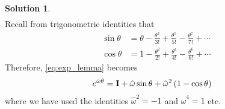 \documentclass[]{article}
\theoremstyle{definition}
\newtheorem{solution}{Solution}
\begin{document}
\begin{solution}
\begin{align}
	\end{align}
	Recall from trigonometric identities that 
	\begin{subequations}
		\begin{align}
		\sin \theta &= \theta - \frac{\theta^3}{3!}  + \frac{\theta^5}{5!} - \frac{\theta^7}{7!}  + \cdots  \nonumber \\
		\cos \theta		&= 1 - \frac{\theta^2}{2!} + \frac{\theta^4}{4!} - \frac{\theta^6}{6!} + \cdots
		\end{align}
	\end{subequations}
%
Therefore, \eqref{eq:exp_lemma} becomes 
%
	\begin{align}
		e^{\hat{\omega}\theta} &= \textbf{I} + \hat{\omega} \sin \theta + \hat{\omega}^2\left(1-\cos \theta \right)
	\end{align}
	where we have used the identities $\hat{\omega}^2 = -1$ and $\hat{\omega}^4 = 1$ etc.
\end{solution}
\end{document}
